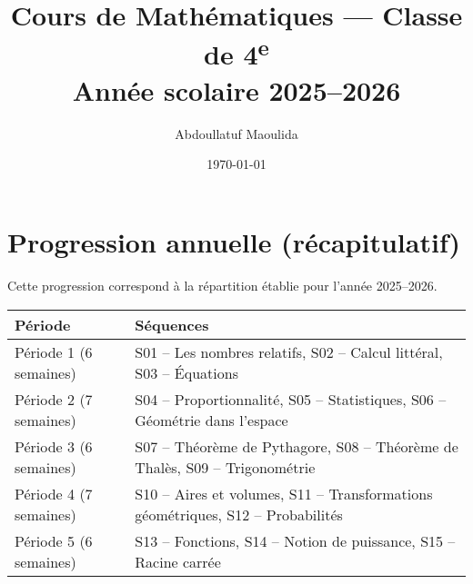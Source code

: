 \documentclass[12pt,a4paper]{book}
\title{Cours de Mathématiques — Classe de 4\textsuperscript{e}\\[0.4em]\large Année scolaire 2025–2026}
\author{Abdoullatuf Maoulida}
\date{\today}
\begin{document}
\maketitle
\tableofcontents
\cleardoublepage


\cleardoublepage
\appendix
\chapter{Progression annuelle (récapitulatif)}
Cette progression correspond à la répartition établie pour l'année 2025–2026.

\begin{center}
\begin{tabular}{|l|l|}
\hline
\textbf{Période} & \textbf{Séquences}\\ \hline
Période 1 (6 semaines) & S01 -- Les nombres relatifs, S02 -- Calcul littéral, S03 -- Équations\\ \hline
Période 2 (7 semaines) & S04 -- Proportionnalité, S05 -- Statistiques, S06 -- Géométrie dans l'espace\\ \hline
Période 3 (6 semaines) & S07 -- Théorème de Pythagore, S08 -- Théorème de Thalès, S09 -- Trigonométrie\\ \hline
Période 4 (7 semaines) & S10 -- Aires et volumes, S11 -- Transformations géométriques, S12 -- Probabilités\\ \hline
Période 5 (6 semaines) & S13 -- Fonctions, S14 -- Notion de puissance, S15 -- Racine carrée\\ \hline
\end{tabular}
\end{center}
\end{document}
